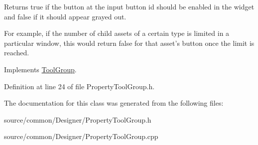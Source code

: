 Returns true if the button at the input button id should be enabled in the widget and false if it should appear grayed out. 

For example, if the number of child assets of a certain type is limited in a particular window, this would return false for that asset's button once the limit is reached. 

Implements \hyperlink{class_tool_group_adf3e25748f41ba5490aac857e375260d}{Tool\-Group}.



Definition at line 24 of file Property\-Tool\-Group.\-h.



The documentation for this class was generated from the following files\-:\begin{DoxyCompactItemize}
\item 
source/common/\-Designer/Property\-Tool\-Group.\-h\item 
source/common/\-Designer/Property\-Tool\-Group.\-cpp\end{DoxyCompactItemize}
